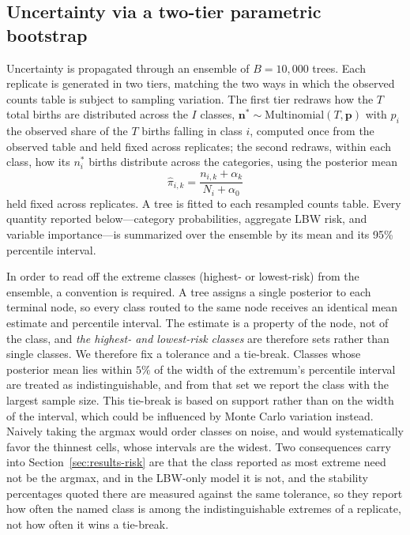 \documentclass[AMA]{USG}
\begin{document}
\subsection{Uncertainty via a two-tier parametric bootstrap}
\label{sec:methods-boot}

Uncertainty is propagated through an ensemble of \(B=10,000\) trees. Each replicate is generated in two tiers, matching the two ways in which the observed counts table is subject to sampling variation. The first tier redraws how the \(T\) total births are distributed across the \(I\) classes, \(\mathbf{n}^\ast \sim \text{Multinomial}(T, \mathbf{p})\) with \(p_i\) the observed share of the \(T\) births falling in class \(i\), computed once from the observed table and held fixed across replicates; the second redraws, within each class, how its \(n_i^\ast\) births distribute across the categories, using the posterior mean
\[
    \hat{\pi}_{i,k} = \frac{n_{i,k} + \alpha_k}{N_i + \alpha_0}
\]
held fixed across replicates. A tree is fitted to each resampled counts table. Every quantity reported below---category probabilities, aggregate LBW risk, and variable importance---is summarized over the ensemble by its mean and its 95\% percentile interval.

In order to read off the extreme classes (highest- or lowest-risk) from the ensemble, a convention is required. A tree assigns a single posterior to each terminal node, so every class routed to the same node receives an identical mean estimate and percentile interval. The estimate is a property of the node, not of the class, and \emph{the highest- and lowest-risk classes} are therefore sets rather than single classes.
We therefore fix a tolerance and a tie-break. Classes whose posterior mean lies within \(5\%\) of the width of the extremum's percentile interval are treated as indistinguishable, and from that set we report the class with the largest sample size. This tie-break is based on support rather than on the width of the interval, which could be influenced by Monte Carlo variation instead. Naively taking the argmax would order classes on noise, and would systematically favor the thinnest cells, whose intervals are the widest. Two consequences carry into Section~\ref{sec:results-risk} are that the class reported as most extreme need not be the argmax, and in the LBW-only model it is not, and the stability percentages quoted there are measured against the same tolerance, so they report how often the named class is among the indistinguishable extremes of a replicate, not how often it wins a tie-break.
\end{document}
